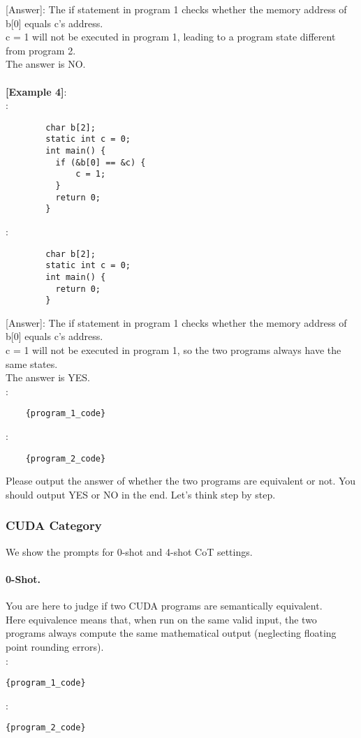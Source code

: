       [Answer]: The if statement in program 1 checks whether the memory address of b[0] equals c's address.\\
                c = 1 will not be executed in program 1, leading to a program state different from program 2.\\
                The answer is NO.\\
\\
    \noindent\textbf{[Example 4]}:\\
      \text{    [Program 1]}:\\
      \begin{lstlisting}
        char b[2];
        static int c = 0;
        int main() {
          if (&b[0] == &c) {
              c = 1;
          }
          return 0;
        }
      \end{lstlisting}
      \text{    [Program 2]}:\\
      \begin{lstlisting}
        char b[2];
        static int c = 0;
        int main() {
          return 0;
        }
      \end{lstlisting}
      [Answer]: The if statement in program 1 checks whether the memory address of b[0] equals c's address.\\
                c = 1 will not be executed in program 1, so the two programs always have the same states.\\
                The answer is YES.\\
    \text{    [Program 1]}:\\
    \begin{lstlisting}
    {program_1_code}
    \end{lstlisting}
    \text{    [Program 2]}:\\
    \begin{lstlisting}
    {program_2_code}
    \end{lstlisting}
    
    Please output the answer of whether the two programs are equivalent or not. You should output YES or NO in the end. Let's think step by step.


\subsubsection{CUDA Category}
We show the prompts for 0-shot and 4-shot CoT settings.

\paragraph{0-Shot.} You are here to judge if two CUDA programs are semantically equivalent.\\
Here equivalence means that, when run on the same valid input, the two programs always compute the same mathematical output (neglecting floating point rounding errors).\\
\text{    [Program 1]}:
\begin{lstlisting}
{program_1_code}
\end{lstlisting}
\text{    [Program 2]}:
\begin{lstlisting}
{program_2_code}
\end{lstlisting}

